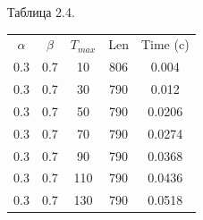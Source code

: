 \documentclass[12pt]{report}
\begin{document}
\begin{minipage}{0.5\textwidth}
\begin{center}
			Таблица 2.4.
			
			\begin{tabular}{|c c c c c|}
				\hline
				$\alpha$ & $\beta$ & $T_{max}$ & Len & Time (c) \\ [0.5ex]
				0.3 & 0.7 & 10 & 806 & 0.004 \\ 
				\hline 
				0.3 & 0.7 & 30 & 790 & 0.012 \\ 
				\hline 
				0.3 & 0.7 & 50 & 790 & 0.0206 \\ 
				\hline 
				0.3 & 0.7 & 70 & 790 & 0.0274 \\ 
				\hline 
				0.3 & 0.7 & 90 & 790 & 0.0368 \\ 
				\hline 
				0.3 & 0.7 & 110 & 790 & 0.0436 \\ 
				\hline 
				0.3 & 0.7 & 130 & 790 & 0.0518 \\ 
				\hline 
			\end{tabular}
			
		\end{center}
	\end{minipage}
	\hfill
\end{document}
